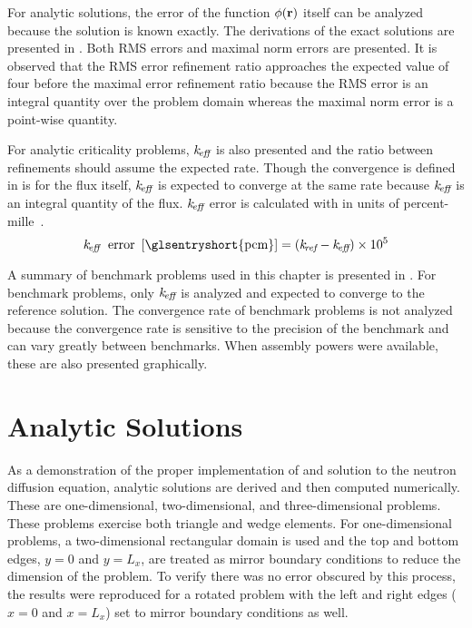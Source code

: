   For analytic solutions, the error of the function $\phi(\mathbf{r})$ itself can be 
  analyzed because the solution is known exactly. The derivations of the exact 
  solutions are presented in . Both RMS errors and
  maximal norm errors are presented. It is observed that the RMS error
  refinement ratio approaches the expected value of four before the maximal
  error refinement ratio because the RMS error is an integral quantity over the
  problem domain whereas the maximal norm error is a point-wise quantity.

  For analytic criticality  problems, $k_{\!\mbox{\scriptsize \em eff}}$ is also presented and the ratio
  between refinements should assume the expected rate. Though the convergence is
  defined in  is for the flux itself, $k_{\!\mbox{\scriptsize \em eff}}$ is expected
  to  converge at the same rate because $k_{\!\mbox{\scriptsize \em eff}}$ is an integral quantity of the
  flux. $k_{\!\mbox{\scriptsize \em eff}}$ error is calculated with  in units of
  percent-mille~.
  \begin{equation}
    \label{eq:keff_err}
    \keff \; \text{ error } \units{\glsentryshort{pcm}} = (\kref - \keff) 
      \times 10^5
  \end{equation}

  A summary of benchmark problems used in this chapter is presented in
  .  For benchmark problems, only $k_{\!\mbox{\scriptsize \em eff}}$ is analyzed and
  expected to converge to the reference solution. The convergence rate of
  benchmark problems is not analyzed because the convergence rate is sensitive
  to the precision of the benchmark and can vary greatly between benchmarks.
  When assembly powers were available, these are also presented graphically. 
  \def\Put(#1,#2)#3{\leavevmode\makebox(0,0){\put(#1,#2){#3}}}

\section{Analytic Solutions}
  As a demonstration of the proper implementation of and solution to the neutron
  diffusion equation, analytic solutions are derived and then computed
  numerically. These are one-dimensional, two-dimensional, and three-dimensional
  problems. These problems exercise both triangle and wedge elements. For
  one-dimensional problems, a two-dimensional rectangular domain is used and the
  top and bottom edges, $y=0$ and $y=L_x$, are treated as mirror boundary
  conditions to reduce the dimension of the problem. To verify there was no
  error obscured by this process, the results were reproduced for a rotated
  problem with the left and right edges ($x=0$ and $x=L_x$) set to mirror
  boundary conditions as well.


